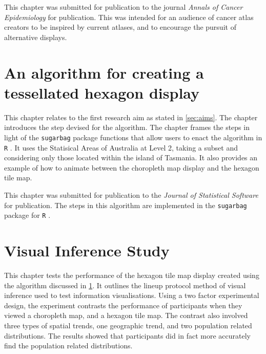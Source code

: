 \documentclass{monashthesis}
\begin{document}
This chapter was submitted for publication to the journal \emph{Annals of Cancer Epidemiology} for publication. This was intended for an audience of cancer atlas creators to be inspired by current atlases, and to encourage the pursuit of alternative displays.





\hypertarget{ch:algorithm}{%
\chapter{An algorithm for creating a tessellated hexagon display}\label{ch:algorithm}}

This chapter relates to the first research aim as stated in \ref{sec:aims}.
The chapter introduces the step devised for the algorithm.
The chapter frames the steps in light of the \texttt{sugarbag} \autocite{sugarbag} package functions that allow users to enact the algorithm in \texttt{R} \autocite{R}. It uses the Statisical Areas of Australia at Level 2, taking a subset and considering only those located within the island of Tasmania.
It also provides an example of how to animate between the choropleth map display and the hexagon tile map.

This chapter was submitted for publication to the \emph{Journal of Statistical Software} for publication.
The steps in this algorithm are implemented in the \texttt{sugarbag} \autocite{sugarbag} package for \texttt{R} \autocite{R}.





\hypertarget{ch:experiment}{%
\chapter{Visual Inference Study}\label{ch:experiment}}

This chapter tests the performance of the hexagon tile map display created using the algorithm discussed in \ref{ch:algorithm}.
It outlines the lineup protocol method of visual inference used to test information visualisations.
Using a two factor experimental design, the experiment contrasts the performance of participants when they viewed a choropleth map, and a hexagon tile map.
The contrast also involved three types of spatial trends, one geographic trend, and two population related distributions.
The results showed that participants did in fact more accurately find the population related distributions.
\end{document}
